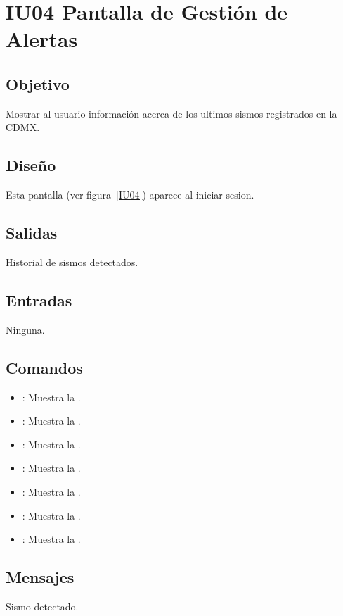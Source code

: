 \section{IU04 Pantalla de Gestión de Alertas}

\subsection{Objetivo}
	Mostrar al usuario información acerca de los ultimos sismos registrados en la CDMX.

\subsection{Diseño}
	Esta pantalla  (ver figura~\ref{IU04}) aparece al iniciar sesion. 


\subsection{Salidas}

	Historial de sismos detectados.

\subsection{Entradas}
	Ninguna.

\subsection{Comandos}
\begin{itemize}
	\item {}: Muestra la .
	\item {}: Muestra la .
	\item {}: Muestra la .
	\item {}: Muestra la .
	\item {}: Muestra la .
	\item {}: Muestra la .
	\item {}: Muestra la .

\end{itemize}

\subsection{Mensajes}

\begin{Citemize}
	\item Sismo detectado.
\end{Citemize}

\clearpage